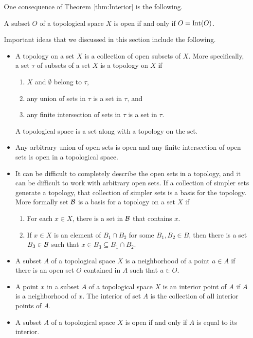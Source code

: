 One consequence of Theorem \ref{thm:Interior} is the following.

\begin{corollary} A subset $O$ of a topological space $X$ is open if and only if $O = \text{Int}(O)$. 
\end{corollary}
 
\label{sec_top_space_summ}
Important ideas that we discussed in this section include the following.
\begin{itemize}
\item A topology on a set $X$ is a collection of open subsets of $X$. More specifically, a set $\tau$ of subsets of a set $X$ is a topology on $X$ if 
	\begin{enumerate}
	\item $X$ and $\emptyset$ belong to $\tau$,
	\item any union of sets in $\tau$ is a set in $\tau$, and
	\item any finite intersection of sets in $\tau$ is a set in $\tau$.
	\end{enumerate}
A topological space is a set along with a topology on the set. 
\item Any arbitrary union of open sets is open and any finite intersection of open sets is open in a topological space. 
\item It can be difficult to completely describe the open sets in a topology, and it can be difficult to work with arbitrary open sets. If a collection of simpler sets generate a topology, that collection of simpler sets is a basis for the topology. More formally 
 set $\mathcal{B}$ is a basis for a topology on a set $X$ if 
	\begin{enumerate}
	\item For each $x \in X$, there is a set in $\mathcal{B}$ that contains $x$.
	\item If $x \in X$ is an element of $B_1 \cap B_2$ for some $B_1, B_2 \in B$, then there is a set $B_3 \in \mathcal{B}$ such that $x \in B_3 \subseteq B_1 \cap B_2$. 
	\end{enumerate}
\item A subset $A$ of a topological space $X$ is a neighborhood of a point $a \in A$ if there is an open set $O$ contained in $A$ such that $a \in O$. 
\item A point $x$ in a subset $A$ of a topological space $X$ is an interior point of $A$ if $A$ is a neighborhood of $x$. The interior of set $A$ is the collection of all interior points of $A$. 
\item A subset $A$ of a topological space $X$ is open if and only if $A$ is equal to its interior. 
\end{itemize}

